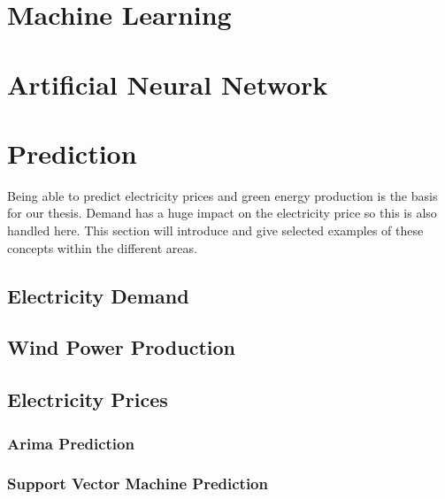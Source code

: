 \documentclass[twoside,11pt,openright]{report}
\begin{document}
\section{Machine Learning}


\newpage
\section{Artificial Neural Network}
\label{sec:annSection}


\newpage
\section{Prediction}
Being able to predict electricity prices and green energy production is the basis for our thesis. Demand has a huge impact on the electricity price so this is also handled here. This section will introduce and give selected examples of these concepts within the different areas. 

\subsection{Electricity Demand}
\label{sec:ElectricityDemand}


\subsection{Wind Power Production}


\subsection{Electricity Prices}
\label{sec:electriciyPrices}


\subsubsection{Arima Prediction}
 
\subsubsection{Support Vector Machine Prediction}


\end{document}
